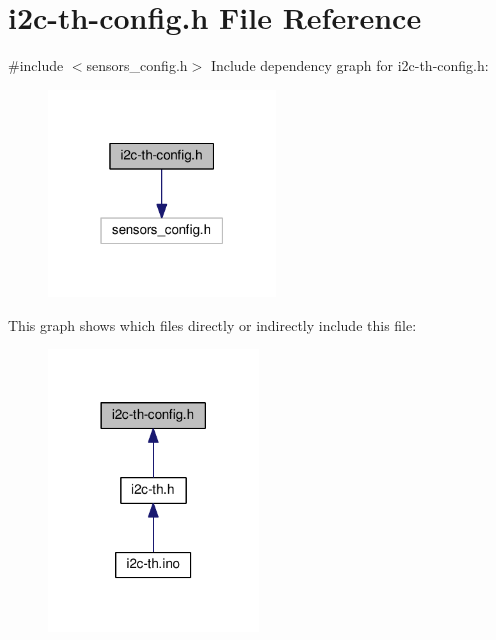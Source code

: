 \hypertarget{i2c-th-config_8h}{}\section{i2c-\/th-\/config.h File Reference}
\label{i2c-th-config_8h}
{\ttfamily \#include $<$sensors\+\_\+config.\+h$>$}\newline
Include dependency graph for i2c-\/th-\/config.h\+:
\nopagebreak
\begin{figure}[H]
\begin{center}
\leavevmode
\includegraphics[width=171pt]{i2c-th-config_8h__incl}
\end{center}
\end{figure}
This graph shows which files directly or indirectly include this file\+:
\nopagebreak
\begin{figure}[H]
\begin{center}
\leavevmode
\includegraphics[width=158pt]{i2c-th-config_8h__dep__incl}
\end{center}
\end{figure}
